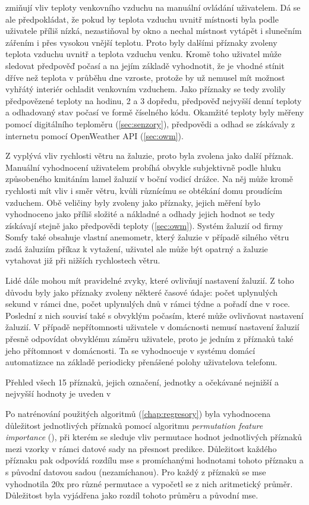  zmiňují vliv teploty venkovního vzduchu na manuální ovládání uživatelem. Dá se ale předpokládat, že pokud by teplota vzduchu uvnitř místnosti byla podle uživatele příliš nízká, nezastiňoval by okno a nechal místnost vytápět i slunečním zářením i přes vysokou vnější teplotu. Proto byly dalšími příznaky zvoleny teplota vzduchu uvnitř a teplota vzduchu venku. Kromě toho uživatel může sledovat předpověď počasí a na jejím základě vyhodnotit, že je vhodné stínit dříve než teplota v průběhu dne vzroste, protože by už nemusel mít možnost vyhřátý interiér ochladit venkovním vzduchem. Jako příznaky se tedy zvolily předpovězené teploty na hodinu, 2 a 3 dopředu, předpověď nejvyšší denní teploty a odhadovaný stav počasí ve formě číselného kódu. Okamžité teploty byly měřeny pomocí digitálního teploměru (\cref{sec:senzory}), předpovědi a odhad se získávaly z internetu pomocí OpenWeather API (\cref{sec:owm}).

Z  vyplývá vliv rychlosti větru na  žaluzie, proto byla zvolena jako další příznak. Manuální vyhodnocení uživatelem probíhá obvykle subjektivně podle hluku způsobeného kmitáním lamel žaluzií v boční vodicí drážce. Na něj může kromě rychlosti mít vliv i směr větru, kvůli různícímu se obtékání domu proudícím vzduchem. Obě veličiny byly zvoleny jako příznaky, jejich měření bylo vyhodnoceno jako příliš složité a nákladné a odhady jejich hodnot se tedy získávají stejně jako předpovědi teploty (\cref{sec:owm}). Systém žaluzií od firmy Somfy také obsahuje vlastní anemometr, který žaluzie v případě silného větru zadá žaluziím příkaz k vytažení, uživatel ale může být opatrný a žaluzie vytahovat již při nižších rychlostech větru.

Lidé dále mohou mít pravidelné zvyky, které ovlivňují nastavení žaluzií. Z toho důvodu byly jako příznaky zvoleny některé časové údaje: počet uplynulých sekund v rámci dne, počet uplynulých dnů v rámci týdne a pořadí dne v roce. Poslední z nich souvisí také s obvyklým počasím, které může ovlivňovat nastavení žaluzií. V případě nepřítomnosti uživatele v domácnosti nemusí nastavení žaluzií přesně odpovídat obvyklému záměru uživatele, proto je jedním z příznaků také jeho přítomnost v domácnosti. Ta se vyhodnocuje v systému domácí automatizace na základě periodicky přenášené polohy uživatelova telefonu.

Přehled všech 15 příznaků, jejich označení, jednotky a očekávané nejnižší a nejvyšší hodnoty je uveden v 


Po natrénování použitých algoritmů (\cref{chap:regresory}) byla vyhodnocena důležitost jednotlivých příznaků pomocí algoritmu \emph{permutation feature importance} (\cite{breiman:pfi}), při kterém se sleduje vliv permutace hodnot jednotlivých příznaků mezi vzorky v rámci datové sady na přesnost predikce. Důležitost každého příznaku pak odpovídá rozdílu \acrshort{mse} s promíchanými hodnotami tohoto příznaku a s původní datovou sadou (nezamíchanou). Pro každý z příznaků se \acrshort{mse} vyhodnotila 20x pro různé permutace a vypočetl se z nich aritmetický průměr. Důležitost byla vyjádřena jako rozdíl tohoto průměru a původní \acrshort{mse}.